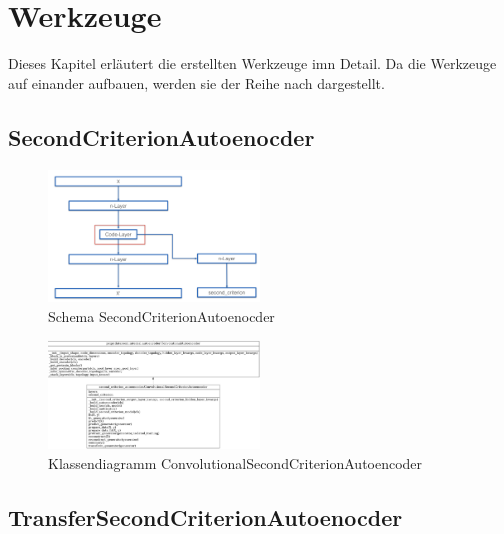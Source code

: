 \listoftodos


\chapter{Werkzeuge}
\label{chap:Werkzeuge}
Dieses Kapitel erläutert die erstellten Werkzeuge imn Detail. Da die Werkzeuge auf einander aufbauen, werden sie der Reihe nach dargestellt. 

	\section{SecondCriterionAutoenocder}
	\label{sec:SecondCriterionAutoenocder}
		
		
		
		\begin{figure}[h]
			\centering
			\includegraphics[width=0.5\textwidth, center]{bilder/Schema_Autoencoders/Schema_SCAE.png}
			\caption[Schema SecondCriterionAutoenocder]{Schema SecondCriterionAutoenocder}
			\label{img:SchemaSCAE}
		\end{figure}  
		
		
		\begin{figure}[h]
			\centering
			\includegraphics[width=0.5\textwidth, center]{bilder/Klassendiagramme/Klassendiagramm_CSCAE.png}
			\caption[Klassendiagramm ConvolutionalSecondCriterionAutoencoder]{Klassendiagramm ConvolutionalSecondCriterionAutoencoder}
			\label{img:KlassendiagrammCSCAE}
		\end{figure}  
		


	\section{TransferSecondCriterionAutoenocder}
	\label{sec:TransferSecondCriterionAutoenocder}

